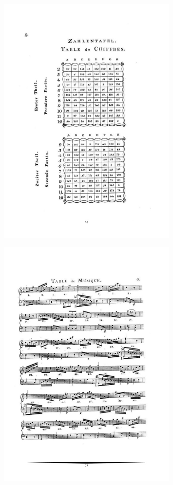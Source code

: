 \documentclass[a4paper, openright, 11pt, titlepage]{report}
\theoremstyle{definition}\newtheorem{defin}[propo]{Definition}
\theoremstyle{definition}\newtheorem{obser}[propo]{Remark}
\theoremstyle{definition}\newtheorem{ejem}[propo]{Ejemplo}
\theoremstyle{definition}\newtheorem{algoritmo}[propo]{Algoritmo}
\begin{document}
\begin{figure}[H]
    \centering
    \includegraphics[width = 0.8\textwidth]{Images/Apéndices/Apéndice E/mozart3.png}
\end{figure}
\begin{figure}[H]
    \centering
    \includegraphics[width = 0.8\textwidth]{Images/Apéndices/Apéndice E/mozart4.png}
\end{figure}
\end{document}

